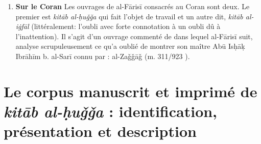 \documentclass[a4paper,12pt]{report}
\begin{document}
\begin{itemize}
\begin{enumerate}
{Très récemment, deux éditions ont parues. La première est paru en 2015 il s'agit une recalcification raisonnée de la matière  scientifiques et des chapitre  \textit{abw\=ab } du\textit{Kit\=ab} 

Abū Bišr  ʿAmr b. ʿUṯmān, (=Sibawayh )\underline {Kitāb}, (éd) Moḥamad al-Bakkāʾ , Beyrouth, Manšurāt Zīn, 2015.

La deuxième en  2021,  est une édition de   toutes les gloses et commentaires faites sur  le \textit{Kit\=ab.} parmi ces gloses celles  de al-F\=aris\=i

Sulaymān al-ʾUyūnī, \underline {Ḥawāšī Kitāb S\=ibawayh}, Dār Ṭatbat al- ḫa ḍrāʾ, Riyad, 2021.

}   
al-F\=aris\=i a eu un rôle important dans la conservation du    Kitāb S\=ibawayh. Dans son étude sur les voies de transmission de Kitāb de S\=ibawayh, Geneviève Humbert a souligné les gloses et collations faites par al-F\=aris\=i sur la copie dont il disposait\footnote{ Voir le chapitre consacré à al-F\=aris\=i dans : Humbert Geneviève, \textit{les voies de transmission de kitāb de sībawayhi}, Leiden, Brill, 1995}. al-F\=aris\=i  a rédigé un commentaire sur le livre de S\=ibawayh   \textit{al-Taʿlīqa ʿalā  kitāb sībawayh}. \footnote{,  al-Fārisī abū ʿAl\=i, \underline{Al-Taʿlīqa ʿalā  kitāb sībawayh}, (éd) ʿAwaḍ al-Quzī, ? , 1990.} 



\item \textbf{	Sur le Coran  }
Les ouvrages de al-F\=aris\=i  consacrés au Coran sont deux. Le premier est\textit{ kitāb al-ḥuǧǧa} qui fait l'objet de travail et un autre dit, \textit{kitāb al- iġfāl} (littéralement: l'oubli avec forte connotation à un oubli dû à l'inattention). Il s'agit d'un ouvrage commenté de  dans lequel al-F\=aris\=i suit, analyse  scrupuleusement ce qu'a oublié de montrer son maître Abū Isḥāḳ Ibrāhīm b. al-Sarī connu par :  al-Zaǧǧāǧ (m. 311/923 ).



\end{enumerate}







\newpage
\section{Le corpus manuscrit et imprimé de \textit{kitāb al-ḥuǧǧa} : identification, présentation et description }


\end{itemize}
\end{document}
